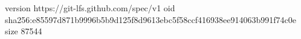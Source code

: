 version https://git-lfs.github.com/spec/v1
oid sha256:e85597d871b9996b5b9d125f8d9613ebc5f58ccf416938ee914063b991f74c0e
size 87544
